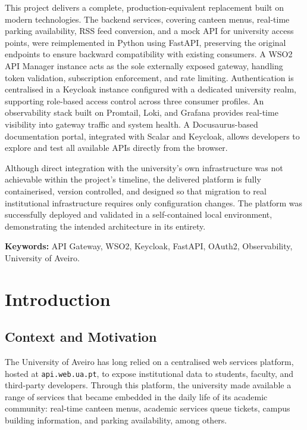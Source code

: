 \documentclass[12pt, a4paper]{report}
\begin{document}
This project delivers a complete, production-equivalent replacement built on modern
technologies. The backend services, covering canteen menus, real-time parking
availability, RSS feed conversion, and a mock API for university access points, were
reimplemented in Python using FastAPI, preserving the original endpoints to ensure
backward compatibility with existing consumers. A WSO2 API Manager instance acts as
the sole externally exposed gateway, handling token validation, subscription enforcement,
and rate limiting. Authentication is centralised in a Keycloak instance configured with
a dedicated university realm, supporting role-based access control across three consumer
profiles. An observability stack built on Promtail, Loki, and Grafana provides real-time
visibility into gateway traffic and system health. A Docusaurus-based documentation
portal, integrated with Scalar and Keycloak, allows developers to explore and test all
available APIs directly from the browser.

Although direct integration with the university's own infrastructure was not achievable
within the project's timeline, the delivered platform is fully containerised, version
controlled, and designed so that migration to real institutional infrastructure requires
only configuration changes. The platform was successfully deployed and validated in a
self-contained local environment, demonstrating the intended architecture in its entirety.

\vspace{1em}
\noindent\textbf{Keywords:} API Gateway, WSO2, Keycloak, FastAPI, OAuth2, Observability,
University of Aveiro.


\vspace{1em}

\tableofcontents
\listoffigures
\listoftables

\cleardoublepage
{}

\chapter{Introduction}
\label{chap:introduction}

\section{Context and Motivation}
The University of Aveiro has long relied on a centralised web services platform,
hosted at \texttt{api.web.ua.pt}, to expose institutional data to students, faculty,
and third-party developers. Through this platform, the university made available a range
of services that became embedded in the daily life of its academic community: real-time
canteen menus, academic services queue tickets, campus building information, and parking
availability, among others.
\end{document}
